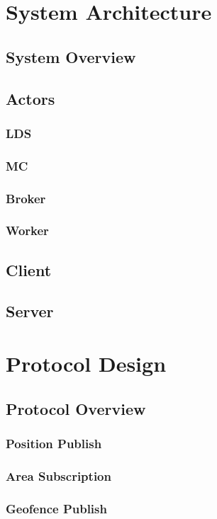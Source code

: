 \documentclass[12pt,a4paper,twoside]{book}
\begin{document}
\chapter{System Architecture}
\section{System Overview}
\section{Actors}
\subsection{LDS}
\subsection{MC}
\subsection{Broker}
\subsection{Worker}
\section{Client}
\section{Server}

\chapter{Protocol Design}
\section{Protocol Overview}
\subsection{Position Publish}
\subsection{Area Subscription}
\subsection{Geofence Publish}
\end{document}
